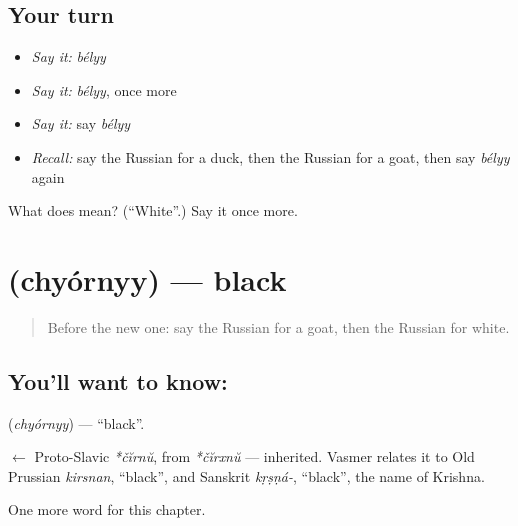 \subsection*{Your turn}
\begin{itemize}
\raggedright
  \item \emph{Say it:} \emph{bélyy}
  \item \emph{Say it:} \emph{bélyy}, once more
  \item \emph{Say it:} say \emph{bélyy}
  \item \emph{Recall:} say the Russian for a duck, then the Russian for a goat, then say \emph{bélyy} again
\end{itemize}

\begin{tcolorbox}[breakable,colback=teal!4,colframe=teal!35!black,title={Before you move on}]
What does  mean? (\textquotedblleft{}White\textquotedblright{}.) Say it once more.
\end{tcolorbox}
\section[\texorpdfstring{\ru{чёрный} (chyórnyy)}{чёрный (chyórnyy)}]{ (chyórnyy) — black}

\label{lesson:RU-C63-black}



\begin{quote}
Before the new one: say the Russian for a goat, then the Russian for white.
\end{quote}

\subsection*{You'll want to know: }
\textbf{} (\emph{chyórnyy}) — \textquotedblleft{}black\textquotedblright{}.

\begin{cousinweb}
\textbf{} $\leftarrow$ Proto-Slavic \emph{*čĭrnŭ}, from \emph{*čĭrxnŭ} — inherited. Vasmer relates it to Old Prussian \emph{kirsnan}, \textquotedblleft{}black\textquotedblright{}, and Sanskrit \emph{kṛṣṇá-}, \textquotedblleft{}black\textquotedblright{}, the name of Krishna.
\end{cousinweb}

\begin{grammarlens}[title={What you've built}]
One more word for this chapter.
\end{grammarlens}

